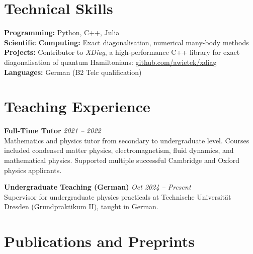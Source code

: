 \documentclass[11pt,a4paper]{article}
\begin{document}
\section{Technical Skills}

\textbf{Programming:} Python, C++, Julia\\
\textbf{Scientific Computing:} Exact diagonalisation, numerical many-body methods\\
\textbf{Projects:} Contributor to \textit{XDiag}, a high-performance C++ library for exact diagonalisation of quantum Hamiltonians: \href{https://github.com/awietek/xdiag}{github.com/awietek/xdiag} \\
\textbf{Languages:} German (B2 Telc qualification)\\

\section{Teaching Experience}

\textbf{Full-Time Tutor} \hfill \textit{2021 -- 2022}\\
Mathematics and physics tutor from secondary to undergraduate level. Courses included condensed matter physics, electromagnetism, fluid dynamics, and mathematical physics. Supported multiple successful Cambridge and Oxford physics applicants.

\textbf{Undergraduate Teaching (German)} \hfill \textit{Oct 2024 -- Present}\\
Supervisor for undergraduate physics practicals at Technische Universität Dresden (Grundpraktikum II), taught in German.

\newpage

\section*{Publications and Preprints}
\end{document}
